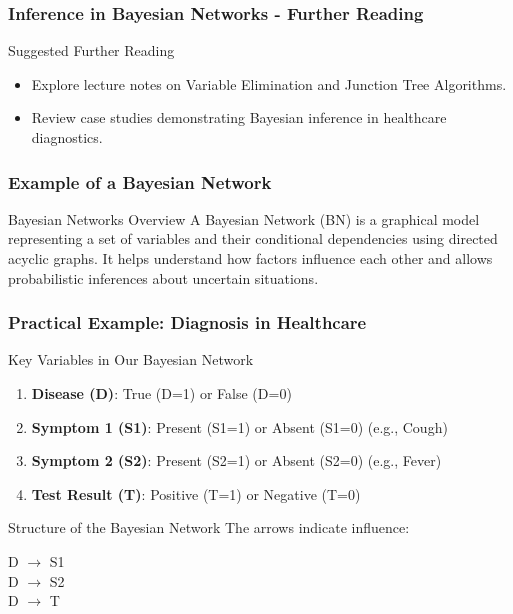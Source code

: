 \documentclass[aspectratio=169]{beamer}
\begin{document}
\begin{frame}[fragile]
    \frametitle{Inference in Bayesian Networks - Further Reading}
    \begin{block}{Suggested Further Reading}
        \begin{itemize}
            \item Explore lecture notes on Variable Elimination and Junction Tree Algorithms.
            \item Review case studies demonstrating Bayesian inference in healthcare diagnostics.
        \end{itemize}
    \end{block}
\end{frame}

\begin{frame}[fragile]
  \frametitle{Example of a Bayesian Network}
  \begin{block}{Bayesian Networks Overview}
    A Bayesian Network (BN) is a graphical model representing a set of variables and their conditional dependencies using directed acyclic graphs. It helps understand how factors influence each other and allows probabilistic inferences about uncertain situations.
  \end{block}
\end{frame}

\begin{frame}[fragile]
  \frametitle{Practical Example: Diagnosis in Healthcare}
  \begin{block}{Key Variables in Our Bayesian Network}
    \begin{enumerate}
      \item \textbf{Disease (D)}: True (D=1) or False (D=0)
      \item \textbf{Symptom 1 (S1)}: Present (S1=1) or Absent (S1=0) (e.g., Cough)
      \item \textbf{Symptom 2 (S2)}: Present (S2=1) or Absent (S2=0) (e.g., Fever)
      \item \textbf{Test Result (T)}: Positive (T=1) or Negative (T=0)
    \end{enumerate}
  \end{block}

  \begin{block}{Structure of the Bayesian Network}
    The arrows indicate influence:
    \begin{center}
      D $\rightarrow$ S1 \\
      D $\rightarrow$ S2 \\
      D $\rightarrow$ T
    \end{center}
  \end{block}
\end{frame}
\end{document}
